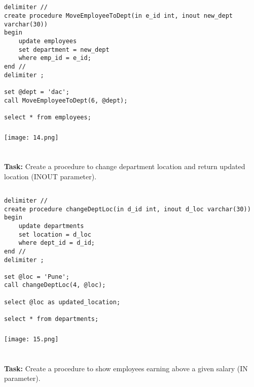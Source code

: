 \documentclass[12pt,a4paper]{article}
\begin{document}
\subsection{}
\begin{lstlisting}
delimiter //
create procedure MoveEmployeeToDept(in e_id int, inout new_dept varchar(30))
begin
	update employees
    set department = new_dept
    where emp_id = e_id;
end //
delimiter ;

set @dept = 'dac';
call MoveEmployeeToDept(6, @dept);

select * from employees;
\end{lstlisting}

\subsubsection{}
\begin{center}
    \texttt{[image: 14.png]}
\end{center}


\section{}
\textbf{Task:} Create a procedure to change department location and return updated location (INOUT parameter).

\subsection{}
\begin{lstlisting}
delimiter //
create procedure changeDeptLoc(in d_id int, inout d_loc varchar(30))
begin
	update departments
    set location = d_loc
    where dept_id = d_id;
end //
delimiter ;

set @loc = 'Pune';
call changeDeptLoc(4, @loc);

select @loc as updated_location;

select * from departments;
\end{lstlisting}

\subsubsection{}
\begin{center}
    \texttt{[image: 15.png]}
\end{center}


\section{}
\textbf{Task:} Create a procedure to show employees earning above a given salary (IN parameter).
\end{document}
